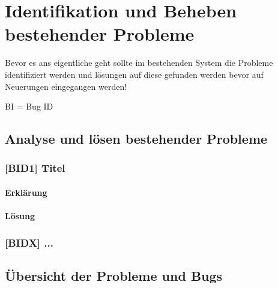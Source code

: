 

\chapter{Identifikation und Beheben bestehender Probleme}
\label{chapter:4}

Bevor es ans eigentliche geht sollte im bestehenden System die Probleme identifiziert werden und lösungen auf diese gefunden werden bevor auf Neuerungen eingegangen werden!




BI = Bug ID

\section{Analyse und lösen bestehender Probleme}

\subsection{[BID1] Titel}

\subsubsection{Erklärung}

\subsubsection{Lösung}

\subsection{[BIDX] ...}

\section{Übersicht der Probleme und Bugs}

